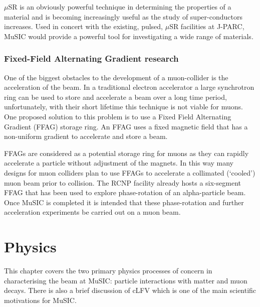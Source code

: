 \( \mu \)SR is an obviously powerful technique in determining the properties of a material and is becoming increasingly useful as the study of super-conductors increases. Used in concert with the existing, pulsed, \( \mu \)SR facilities at J-PARC, MuSIC would provide a powerful tool for investigating a wide range of materials.

\subsubsection{Fixed-Field Alternating Gradient research} %
\label{sub:ffag_research}
One of the biggest obstacles to the development of a muon-collider is the acceleration of the beam. In a traditional electron accelerator a large synchrotron ring can be used to store and accelerate a beam over a long time period, unfortunately, with their short lifetime this technique is not viable for muons. One proposed solution to this problem is to use a Fixed Field Alternating Gradient (FFAG) storage ring. An FFAG uses a fixed magnetic field that has a non-uniform gradient to accelerate and store a beam.

FFAGs are considered as a potential storage ring for muons as they can rapidly accelerate a particle without adjustment of the magnets. In this way many designs for muon colliders plan to use FFAGs to accelerate a collimated (`cooled') muon beam prior to collision. The RCNP facility already hosts a six-segment FFAG that has been used to explore phase-rotation of an alpha-particle beam. Once MuSIC is completed it is intended that these phase-rotation and further acceleration experiments be carried out on a muon beam.
\section{Physics} %
\label{cha:physics}
This chapter covers the two primary physics processes of concern in characterising the beam at MuSIC: particle interactions with matter and muon decays. There is also a brief discussion of cLFV which is one of the main scientific motivations for MuSIC. 
